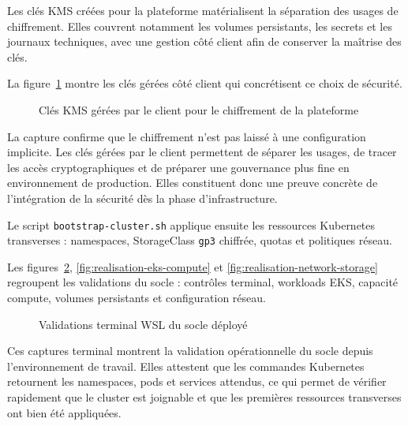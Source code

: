 Les clés KMS créées pour la plateforme matérialisent la séparation des usages de chiffrement. Elles couvrent notamment les volumes persistants, les secrets et les journaux techniques, avec une gestion côté client afin de conserver la maîtrise des clés.

La figure~\ref{fig:realisation-kms-customer-managed-keys} montre les clés gérées côté client qui concrétisent ce choix de sécurité.

\begin{figure}[H]
\centering
{}
\caption{Clés KMS gérées par le client pour le chiffrement de la plateforme}
\label{fig:realisation-kms-customer-managed-keys}
\end{figure}

La capture confirme que le chiffrement n'est pas laissé à une configuration implicite. Les clés gérées par le client permettent de séparer les usages, de tracer les accès cryptographiques et de préparer une gouvernance plus fine en environnement de production. Elles constituent donc une preuve concrète de l'intégration de la sécurité dès la phase d'infrastructure.

Le script \texttt{bootstrap-cluster.sh} applique ensuite les ressources Kubernetes transverses : namespaces, StorageClass \texttt{gp3} chiffrée, quotas et politiques réseau.

Les figures~\ref{fig:realisation-wsl-validations}, \ref{fig:realisation-eks-compute} et \ref{fig:realisation-network-storage} regroupent les validations du socle : contrôles terminal, workloads EKS, capacité compute, volumes persistants et configuration réseau.

\begin{figure}[H]
\centering
{}
\caption{Validations terminal WSL du socle déployé}
\label{fig:realisation-wsl-validations}
\end{figure}

Ces captures terminal montrent la validation opérationnelle du socle depuis l'environnement de travail. Elles attestent que les commandes Kubernetes retournent les namespaces, pods et services attendus, ce qui permet de vérifier rapidement que le cluster est joignable et que les premières ressources transverses ont bien été appliquées.

